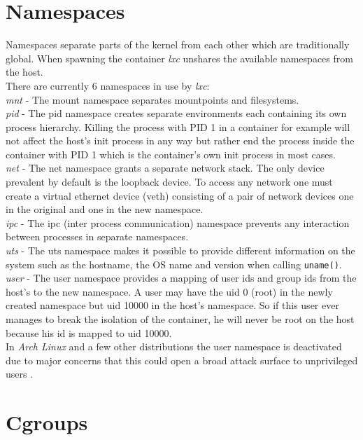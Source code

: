 \section{Namespaces}

Namespaces\cite{namespaces} separate parts of the kernel from each other which are traditionally global. When spawning the container \textit{lxc} unshares
the available namespaces from the host.\\
There are currently 6 namespaces in use by \textit{lxc}:\\
\textit{mnt} - The mount namespace separates mountpoints and filesystems.\\
\textit{pid} - The pid namespace creates separate environments each containing its own process hierarchy. Killing the process with PID 1
in a container for example will not affect the host's init process in any way but rather end the process inside the container with PID 1
which is the container's own init process in most cases.\\
\textit{net} - The net namespace grants a separate network stack. The only device prevalent by default is the loopback device. To access any network
one must create a virtual ethernet device (veth) consisting of a pair of network devices one in the original and one in the new namespace.\\
\textit{ipc} - The ipc (inter process communication) namespace prevents any interaction between processes in separate namespaces.\\
\textit{uts} - The uts namespace makes it possible to provide different information on the system such as the hostname, the OS name and version
when calling \texttt{uname()}.\\
\textit{user} - The user namespace provides a mapping of user ids and group ids from the host's to the new namespace. A user may have the uid 0
(root) in the newly created namespace but uid 10000 in the host's namespace. So if this user ever manages to break the isolation of the
container, he will never be root on the host because his id is mapped to uid 10000.\\
In \textit{Arch Linux} and a few other distributions the user namespace is deactivated due to major concerns that this could open a broad
attack surface to unprivileged users \cite{archuserns}.

\section{Cgroups}

